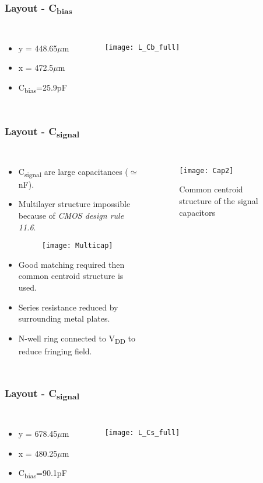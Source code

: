 \begin{frame}
\frametitle{Layout - C\textsubscript{bias}}
\begin{columns}
	\begin{itemize}
		\item y = 448.65$\mu$m
		\item x = 472.5$\mu$m
		\item C\textsubscript{bias}=25.9pF
	\end{itemize}
	
	\begin{figure}[H]
		\centering
		\texttt{[image: L\_Cb\_full]}
		\label{L_Cb_full}
	\end{figure}
\end{columns}
\end{frame}

\begin{frame}
\frametitle{Layout - C\textsubscript{signal}}
\begin{columns}
	\begin{itemize}
	\item C\textsubscript{signal} are large capacitances ($\simeq$nF).
	\item Multilayer structure impossible because of \emph{CMOS design rule 11.6}.
	\begin{figure}[H]
		\centering
		\texttt{[image: Multicap]}
		\label{Cap3}
	\end{figure}
	\item Good matching required  then common centroid structure is used. \item Series resistance reduced by surrounding metal plates. \item N-well ring connected to V\textsubscript{DD} to reduce fringing field.
	\end{itemize}
	\begin{figure}[H]
		\centering
		\texttt{[image: Cap2]}
		\caption{Common centroid structure of the signal capacitors}
		\label{Cap2}
	\end{figure}
\end{columns}
\end{frame}

\begin{frame}
	\frametitle{Layout - C\textsubscript{signal}}
	\begin{columns}
	\begin{itemize}
		\item y = 678.45$\mu$m
		\item x = 480.25$\mu$m
		\item C\textsubscript{bias}=90.1pF
	\end{itemize}
	\begin{figure}[H]
		\centering
		\texttt{[image: L\_Cs\_full]}
		\label{L_Cs_full}
	\end{figure}
	\end{columns}
\end{frame}

